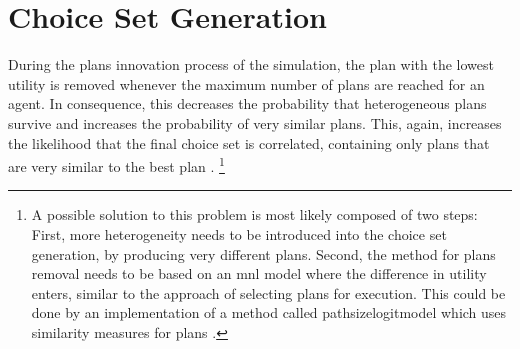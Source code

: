 \vfill\eject
\section{Choice Set Generation}
\label{sec:choicesets}


During the plans innovation process of the simulation, the plan with the lowest utility is removed whenever the maximum number of plans are reached for an agent. In consequence, this decreases the probability that heterogeneous plans survive and increases the probability of very similar plans. This, again, increases the likelihood that the final choice set is correlated, \ie containing only plans that are very similar to the best plan \citep[see][for a review on correlation of 
 routes]{Prato2009ChoiceModellingSurvey}.%
 \footnote{
 A possible solution to this problem is most likely composed of two steps:
 First, more heterogeneity needs to be introduced into the choice set generation, \eg by producing very different plans.
 Second, the method for plans removal needs to be based on an \gls{mnl} model where the difference in utility enters, similar to the approach of selecting plans for execution. This could be done by an implementation of a method called \gls{pathsizelogitmodel} which uses similarity measures for plans \citep[see][for a possible solution in route choice]{FrejingerBierlaire2007PathSizeLogit, BenAkivaBierlaiere1999DiscreteChoice}.
 }


